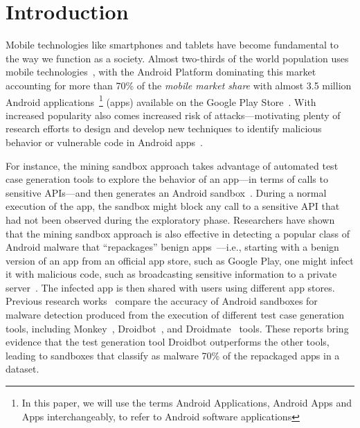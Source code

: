 \section{Introduction}\label{sec:introduction}

Mobile technologies like smartphones and tablets have become fundamental to the way we function as a society. Almost two-thirds of the world population
uses mobile technologies~\cite{Comscore,DBLP:journals/tse/MartinSJZH17}, with the
Android Platform dominating this market accounting for more than 70\% of the \emph{mobile
market share} with almost 3.5 million Android applications~\footnote{In this paper, we will use the terms Android Applications, Android Apps and Apps interchangeably, to refer to Android software applications} (apps)
available on the Google Play Store~\cite{Statista}. 
With increased popularity also comes increased risk of attacks---motivating plenty of research efforts to design and develop new techniques
to identify malicious behavior or vulnerable code in Android apps~\cite{10.1145/3017427}.


For instance, the
mining sandbox approach takes advantage of automated test case generation tools 
to explore the behavior of an app---in terms of calls to sensitive APIs---and then
generates an Android sandbox~\cite{DBLP:conf/icse/JamrozikSZ16}. During a normal
execution of the app, the sandbox might block any call to a sensitive API
that had not been observed during the exploratory phase. 
Researchers have shown that the mining sandbox approach is also effective
in detecting a popular class of Android malware that ``repackages'' benign apps~\cite{DBLP:conf/wcre/BaoLL18,le2018towards}---i.e., starting with a benign version of an app from an official app store, such as Google Play, one might infect it with
malicious code, such as broadcasting
sensitive information to a private server~\cite{DBLP:journals/tse/LiBK21}. The infected app is then
shared with users using different app stores. 
Previous research works~\cite{DBLP:conf/wcre/BaoLL18,DBLP:journals/jss/CostaMMSSBNR22} compare the accuracy of Android sandboxes for malware detection 
produced from the execution of different test case generation tools, including Monkey~\cite{Monkey}, Droidbot~\cite{DBLP:conf/icse/LiYGC17}, and Droidmate~\cite{DBLP:conf/kbse/BorgesHZ18} tools.
These reports bring evidence that the test generation tool Droidbot outperforms the other tools, leading to sandboxes that
classify as malware 70\% of the repackaged apps in a dataset.

